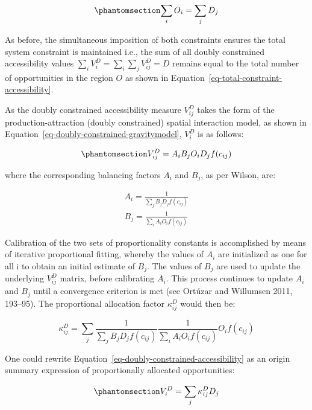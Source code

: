 \documentclass[
]{article}
\begin{document}
\begin{equation}\phantomsection\label{eq-opportunity-population-equality}{
\sum_i O_i = \sum_j D_j
}\end{equation}

As before, the simultaneous imposition of both constraints ensures the
total system constraint is maintained i.e., the sum of all doubly
constrained accessibility values
\(\sum_i V^D_{i} = \sum_i\sum_j  V^D_{ij} = D\) remains equal to the
total number of opportunities in the region \(O\) as shown in
Equation~\ref{eq-total-constraint-accessibility}.

As the doubly constrained accessibility measure \(V_{ij}^D\) takes the
form of the production-attraction (doubly constrained) spatial
interaction model, as shown in
Equation~\ref{eq-doubly-constrained-gravitymodel}, \(V_{i}^D\) is as
follows:

\begin{equation}\phantomsection\label{eq-doubly-constrained-accessibility}{
V_{ij}^D = A_i B_j O_i D_j f(c_{ij})
}\end{equation}

\noindent where the corresponding balancing factors \(A_i\) and \(B_j\),
as per Wilson, are:

\[
\begin{array}{l}
A_i = \frac{1}{\sum_j B_j D_j f(c_{ij})}\\
B_j = \frac{1}{\sum_i A_i O_i f(c_{ij})}
\end{array}
\]

Calibration of the two sets of proportionality constants is accomplished
by means of iterative proportional fitting, whereby the values of
\(A_i\) are initialized as one for all i to obtain an initial estimate
of \(B_j\). The values of \(B_j\) are used to update the underlying
\(V_{ij}^D\) matrix, before calibrating \(A_i\). This process continues
to update \(A_i\) and \(B_j\) until a convergence criterion is met (see
Ortúzar and Willumsen 2011, 193--95). The proportional allocation factor
\(\kappa_{ij}^D\) would then be:

\[
\kappa_{ij}^D = \sum_j \frac{1}{\sum_j B_j D_j f(c_{ij})} \frac{1}{\sum_i A_i O_i f(c_{ij})} O_i f(c_{ij})
\]

One could rewrite Equation~\ref{eq-doubly-constrained-accessibility} as
an origin summary expression of proportionally allocated opportunities:

\begin{equation}\phantomsection\label{eq-doubly-constrained-accessibility-w-paf}{
V^D_{i} = \sum_j \kappa^D_{ij} D_j
}\end{equation}
\end{document}
